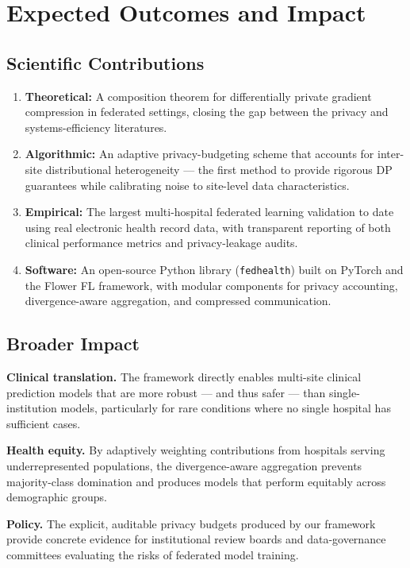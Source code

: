 \section{Expected Outcomes and Impact}

\subsection{Scientific Contributions}

\begin{enumerate}[leftmargin=*,label={\color{accent}\bfseries\arabic*.}]
  \item \textbf{Theoretical:} A composition theorem for differentially private gradient
    compression in federated settings, closing the gap between the privacy and
    systems-efficiency literatures.
  \item \textbf{Algorithmic:} An adaptive privacy-budgeting scheme that accounts for
    inter-site distributional heterogeneity — the first method to provide rigorous DP
    guarantees while calibrating noise to site-level data characteristics.
  \item \textbf{Empirical:} The largest multi-hospital federated learning validation to date
    using real electronic health record data, with transparent reporting of both clinical
    performance metrics and privacy-leakage audits.
  \item \textbf{Software:} An open-source Python library (\texttt{fedhealth}) built on
    PyTorch and the Flower FL framework, with modular components for privacy accounting,
    divergence-aware aggregation, and compressed communication.
\end{enumerate}

\subsection{Broader Impact}

\textbf{Clinical translation.} The framework directly enables multi-site clinical prediction
models that are more robust — and thus safer — than single-institution models, particularly
for rare conditions where no single hospital has sufficient cases.

\textbf{Health equity.} By adaptively weighting contributions from hospitals serving
underrepresented populations, the divergence-aware aggregation prevents majority-class
domination and produces models that perform equitably across demographic groups.

\textbf{Policy.} The explicit, auditable privacy budgets produced by our framework provide
concrete evidence for institutional review boards and data-governance committees evaluating
the risks of federated model training.

